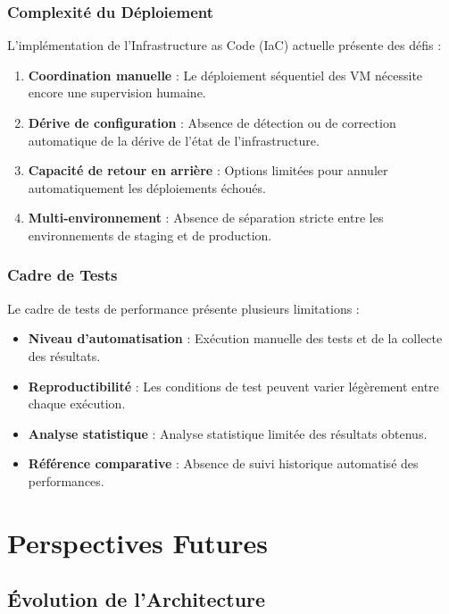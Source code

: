 \documentclass[12pt,a4paper]{report}
\begin{document}
\subsubsection{Complexité du Déploiement}

L'implémentation de l'Infrastructure as Code (IaC) actuelle présente des défis :

\begin{enumerate}
    \item \textbf{Coordination manuelle} : Le déploiement séquentiel des VM nécessite encore une supervision humaine.
    \item \textbf{Dérive de configuration} : Absence de détection ou de correction automatique de la dérive de l'état de l'infrastructure.
    \item \textbf{Capacité de retour en arrière} : Options limitées pour annuler automatiquement les déploiements échoués.
    \item \textbf{Multi-environnement} : Absence de séparation stricte entre les environnements de staging et de production.
\end{enumerate}

\subsubsection{Cadre de Tests}

Le cadre de tests de performance présente plusieurs limitations :

\begin{itemize}
    \item \textbf{Niveau d'automatisation} : Exécution manuelle des tests et de la collecte des résultats.
    \item \textbf{Reproductibilité} : Les conditions de test peuvent varier légèrement entre chaque exécution.
    \item \textbf{Analyse statistique} : Analyse statistique limitée des résultats obtenus.
    \item \textbf{Référence comparative} : Absence de suivi historique automatisé des performances.
\end{itemize}

\section{Perspectives Futures}

\subsection{Évolution de l'Architecture}
\end{document}
